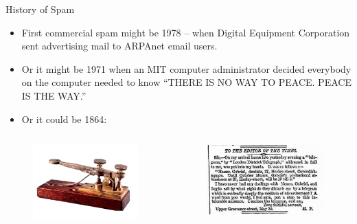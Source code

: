 \documentclass[nobackground,dvipsnames,table]{beamer}
\begin{document}
\begin{frame}{History of Spam}
    \begin{itemize}
        \item First commercial spam might be 1978  -- when Digital Equipment Corporation sent advertising mail to ARPAnet email users.
        \item Or it might be 1971 when an MIT computer administrator decided everybody on the computer needed to know “THERE IS NO WAY TO PEACE. PEACE IS THE WAY.”
        \item Or it could be 1864: 
    \end{itemize}
    \begin{columns}
            \begin{figure}
                \centering
                \includegraphics[width=\textwidth]{telegraph}
            \end{figure}
            \begin{figure}
                \centering
                \includegraphics[width=\textwidth]{telegram-spam}
            \end{figure}
    \end{columns}
\end{frame}
\end{document}
